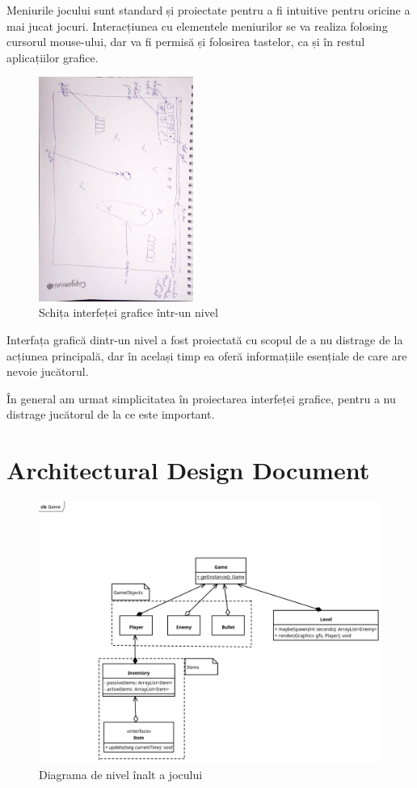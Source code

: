 \documentclass{article}
\begin{document}
    Meniurile jocului sunt standard și proiectate pentru a fi intuitive pentru oricine a mai jucat
    jocuri. Interacțiunea cu elementele meniurilor se va realiza folosing cursorul mouse-ului, dar
    va fi permisă și folosirea tastelor, ca și în restul aplicațiilor grafice.

    \begin{figure}[H]
        \includegraphics[width=0.45\textwidth, angle=90]{designing-level-ui}
        \centering
        \caption{Schița interfeței grafice într-un nivel}
    \end{figure}

    Interfața grafică dintr-un nivel a fost proiectată cu scopul de a nu distrage de
    la acțiunea principală, dar în același timp ea oferă informațiile esențiale de care are
    nevoie jucătorul.

    În general am urmat simplicitatea în proiectarea interfeței grafice, pentru a nu distrage
    jucătorul de la ce este important.


    \section{Architectural Design Document}
    \FloatBarrier
    \begin{figure}[H]
        \includegraphics[width=\linewidth]{high-level-diagram}
        \centering
        \caption{Diagrama de nivel înalt a jocului}
    \end{figure}
\end{document}
